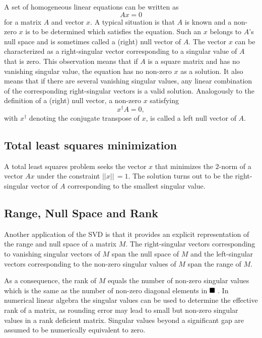 \documentclass[aps,preprint]{revtex4}%
\providecommand{\U}[1]{\protect\rule{.1in}{.1in}}
\begin{document}
A set of homogeneous linear equations can be written as
\begin{equation}
Ax=0
\end{equation}
for a matrix $A$ and vector $x$. A typical situation is that $A$ is known and
a non-zero $x$ is to be determined which satisfies the equation. Such an $x$
belongs to $A$'s null space and is sometimes called a (right) null vector of
$A$. The vector $x$ can be characterized as a right-singular vector
corresponding to a singular value of $A$ that is zero. This observation means
that if $A$ is a square matrix and has no vanishing singular value, the
equation has no non-zero $x$ as a solution. It also means that if there are
several vanishing singular values, any linear combination of the corresponding
right-singular vectors is a valid solution. Analogously to the definition of a
(right) null vector, a non-zero $x$ satisfying
\begin{equation}
x^{\dagger}A=0,
\end{equation}
with $x^{\dagger}$ denoting the conjugate transpose of $x$, is called a left
null vector of $A$.

\subsection{Total least squares minimization}

A total least squares problem seeks the vector $x$ that minimizes the $2$-norm
of a vector $Ax$ under the constraint $||x||\,=1$. The solution turns out to
be the right-singular vector of $A$ corresponding to the smallest singular value.

\subsection{Range, Null Space and Rank}

Another application of the SVD is that it provides an explicit representation
of the range and null space of a matrix $M$. The right-singular vectors
corresponding to vanishing singular vectors of $M$ span the null space of $M$
and the left-singular vectors corresponding to the non-zero singular values of
$M$ span the range of $M$.

As a consequence, the rank of $M$ equals the number of non-zero singular
values which is the same as the number of non-zero diagonal elements in
$\U{3a3} $ . In numerical linear algebra the singular values can be used to
determine the effective rank of a matrix, as rounding error may lead to small
but non-zero singular values in a rank deficient matrix. Singular values
beyond a significant gap are assumed to be numerically equivalent to zero.
\end{document}
